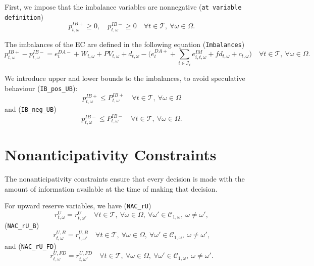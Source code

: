 \documentclass{article}
\begin{document}
First, we impose that the imbalance variables are nonnegative (\verb|at variable definition|)
\begin{equation} \label{EQ:IBVarDef}
    p_{t, \omega}^{IB+} \geq 0, \quad p_{t, \omega}^{IB-} \geq 0 \quad \forall t \in \mathcal{T}, \ \forall \omega \in \Omega.
\end{equation}

The imbalances of the EC are defined in the following equation (\verb|Imbalances|)
\begin{equation} \label{EQ:IBDef}
    p^{IB+}_{t, \omega} - p^{IB-}_{t, \omega} = e^{DA-}_{t} + W_{t, \omega} + PV_{t, \omega} + d_{t, \omega} - \Big (e^{DA+}_{t} + \sum_{i \in \mathcal{I}_t} e^{IM}_{i, t, \omega} + fd_{t, \omega} + c_{t, \omega} \Big ) \quad \forall t \in \mathcal{T}, \ \forall \omega \in \Omega.
\end{equation}

We introduce upper and lower bounds to the imbalances, to avoid speculative behaviour (\verb|IB_pos_UB|):
\begin{equation} \label{EQ:VPP_IB_MAX}
	p_{t, \omega}^{IB+} \leq P_{t, \omega}^{IB+} \quad \forall t \in \mathcal{T}, \ \forall \omega \in \Omega
\end{equation}
and (\verb|IB_neg_UB|)
\begin{equation} \label{EQ:VPP_IB_MIN}
	p_{t, \omega}^{IB-} \leq P_{t, \omega}^{IB-} \quad \forall t \in \mathcal{T}, \ \forall \omega \in \Omega.
\end{equation}



\section{Nonanticipativity Constraints}
\label{SEC:NonanticipativityConstraints}

The nonanticipativity constraints ensure that every decision is made with the amount of information available at the time of making that decision.



For upward reserve variables, we have (\verb|NAC_rU|)
\begin{equation} \label{EQ:NAC_pVRU}
	r^U_{t, \omega} = r^U_{t, \omega'} \quad \forall t \in \mathcal{T}, \ \forall \omega \in \Omega, \ \forall \omega' \in \mathcal{C}_{1, \omega}, \ \omega \neq \omega',
\end{equation}
(\verb|NAC_rU_B|)
\begin{equation} \label{EQ:NAC_rUB}
	r^{U, B}_{t, \omega} = r^{U, B}_{t, \omega'} \quad \forall t \in \mathcal{T}, \ \forall \omega \in \Omega, \ \forall \omega' \in \mathcal{C}_{1, \omega}, \ \omega \neq \omega',
\end{equation}
and (\verb|NAC_rU_FD|)
\begin{equation} \label{EQ:NAC_rUFD}
	r^{U, FD}_{t, \omega} = r^{U, FD}_{t, \omega'} \quad \forall t \in \mathcal{T}, \ \forall \omega \in \Omega, \ \forall \omega' \in \mathcal{C}_{1, \omega}, \ \omega \neq \omega'.
\end{equation}
\end{document}
